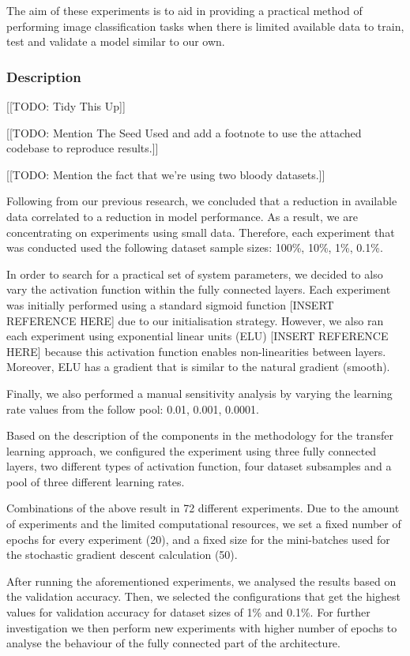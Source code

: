 \documentclass{article}
\begin{document}
The aim of these experiments is to aid in providing a practical method of performing image classification tasks when there is limited available data to train, test and validate a model similar to our own.

\subsubsection{\textbf{Description}}

[[TODO: Tidy This Up]]

[[TODO: Mention The Seed Used and add a footnote to use the attached codebase to reproduce results.]]

[[TODO: Mention the fact that we're using two bloody datasets.]]

Following from our previous research, we concluded that a reduction in available data correlated to a reduction in model performance. As a result, we are concentrating on experiments using small data. Therefore, each experiment that was conducted used the following dataset sample sizes: 100\%, 10\%, 1\%, 0.1\%.

In order to search for a practical set of system parameters, we decided to also vary the activation function within the fully connected layers. Each experiment was initially performed using a standard sigmoid function [INSERT REFERENCE HERE] due to our initialisation strategy. However, we also ran each experiment using exponential linear units (ELU) [INSERT REFERENCE HERE] because this activation function enables non-linearities between layers. Moreover, ELU has a gradient that is similar to the natural gradient (smooth).

Finally, we also performed a manual sensitivity analysis by varying the learning rate values from the follow pool: 0.01, 0.001, 0.0001.

Based on the description of the components in the methodology for the transfer learning approach, we configured the experiment using three fully connected layers, two different types of activation function, four dataset subsamples and a pool of three different learning rates.

Combinations of the above result in 72 different experiments. Due to the amount of experiments and the limited computational resources, we set a fixed number of epochs for every experiment (20), and a fixed size for the mini-batches used for the stochastic gradient descent calculation (50).

After running the aforementioned experiments, we analysed the results based on the validation accuracy. Then, we selected the configurations that get the highest values for validation accuracy for dataset sizes of 1\% and 0.1\%. For further investigation we then perform new experiments with higher number of epochs to analyse the behaviour of the fully connected part of the architecture.
\end{document}
